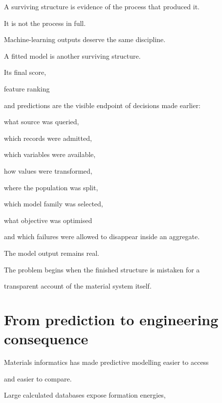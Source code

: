 \documentclass[11pt,a4paper,oneside]{report}
\begin{document}
\begin{governingrule}



A surviving structure is evidence of the process that produced it.



It is not the process in full.



\end{governingrule}



Machine-learning outputs deserve the same discipline.



A fitted model is another surviving structure.



Its final score,

feature ranking

and predictions are the visible endpoint of decisions made earlier:

what source was queried,

which records were admitted,

which variables were available,

how values were transformed,

where the population was split,

which model family was selected,

what objective was optimised

and which failures were allowed to disappear inside an aggregate.



The model output remains real.



The problem begins when the finished structure is mistaken for a

transparent account of the material system itself.



\section{From prediction to engineering consequence}



Materials informatics has made predictive modelling easier to access

and easier to compare.



Large calculated databases expose formation energies,
\end{document}
